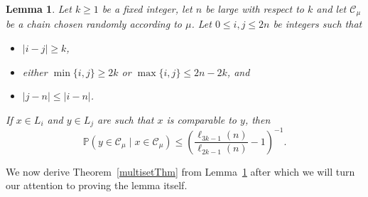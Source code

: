 \documentclass[11 pt]{article}
\newtheorem{lem}[equation]{Lemma}
\theoremstyle{definition}
\theoremstyle{case}
\numberwithin{equation}{section}
\begin{document}
\begin{lem}
\label{conditionalProb}
Let $k\geq1$ be a fixed integer, let $n$ be large with respect to $k$ and let $\mathcal{C}_\mu$ be a chain chosen randomly according to $\mu$. Let $0\leq i,j\leq 2n$ be integers such that
\begin{itemize}
\item $|i-j|\geq k$, 
\item either $\min\{i,j\}\geq 2k$ or $\max\{i,j\}\leq 2n-2k$, and
\item $|j-n|\leq |i-n|$.
\end{itemize}
If $x\in L_i$ and $y\in L_j$ are such that $x$ is comparable to $y$, then 
\[\mathbb{P}\left(y\in \mathcal{C}_\mu\mid x\in\mathcal{C}_\mu\right)\leq \left(\frac{\ell_{3k-1}(n)}{\ell_{2k-1}(n)} - 1\right)^{-1}.\]
\end{lem}

We now derive Theorem~\ref{multisetThm} from Lemma~\ref{conditionalProb} after which we will turn our attention to proving the lemma itself.
\end{document}
